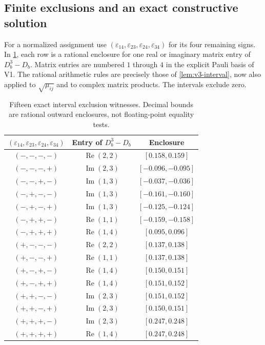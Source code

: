 \documentclass[11pt]{article}
\theoremstyle{definition}
\theoremstyle{remark}
\begin{document}
\subsection{Finite exclusions and an exact constructive solution}
For a normalized assignment use
$(\varepsilon_{14},\varepsilon_{23},\varepsilon_{24},\varepsilon_{34})$
for its four remaining signs. In \cref{tab:v3-witnesses}, each row is a
rational enclosure for one real or imaginary matrix entry of $D_b^3-D_b$.
Matrix entries are numbered $1$ through $4$ in the explicit Pauli basis of
V1. The rational arithmetic rules are precisely those of
\cref{lem:v3-interval}, now also applied to $\sqrt{\mu_{ij}}$ and to
complex matrix products. The intervals exclude zero.

\begin{table}[htbp]
\centering\small
\caption{Fifteen exact interval exclusion witnesses. Decimal bounds are
rational outward enclosures, not floating-point equality tests.}
\label{tab:v3-witnesses}
\begin{tabular}{ccc}
\toprule
$(\varepsilon_{14},\varepsilon_{23},\varepsilon_{24},\varepsilon_{34})$
& Entry of $D_b^3-D_b$ & Enclosure\\\midrule
$(-,-,-,-)$ & $\operatorname{Re}(2,2)$ & $[0.158,0.159]$\\
$(-,-,-,+)$ & $\operatorname{Im}(2,3)$ & $[-0.096,-0.095]$\\
$(-,-,+,-)$ & $\operatorname{Im}(1,3)$ & $[-0.037,-0.036]$\\
$(-,+,-,-)$ & $\operatorname{Im}(1,3)$ & $[-0.161,-0.160]$\\
$(-,+,-,+)$ & $\operatorname{Im}(1,3)$ & $[-0.125,-0.124]$\\
$(-,+,+,-)$ & $\operatorname{Re}(1,1)$ & $[-0.159,-0.158]$\\
$(-,+,+,+)$ & $\operatorname{Re}(1,4)$ & $[0.095,0.096]$\\
$(+,-,-,-)$ & $\operatorname{Re}(2,2)$ & $[0.137,0.138]$\\
$(+,-,-,+)$ & $\operatorname{Re}(1,1)$ & $[0.137,0.138]$\\
$(+,-,+,-)$ & $\operatorname{Re}(1,4)$ & $[0.150,0.151]$\\
$(+,-,+,+)$ & $\operatorname{Re}(1,4)$ & $[0.151,0.152]$\\
$(+,+,-,-)$ & $\operatorname{Im}(2,3)$ & $[0.151,0.152]$\\
$(+,+,-,+)$ & $\operatorname{Im}(2,3)$ & $[0.150,0.151]$\\
$(+,+,+,-)$ & $\operatorname{Im}(2,3)$ & $[0.247,0.248]$\\
$(+,+,+,+)$ & $\operatorname{Re}(1,4)$ & $[0.247,0.248]$\\
\bottomrule
\end{tabular}
\end{table}
\end{document}
